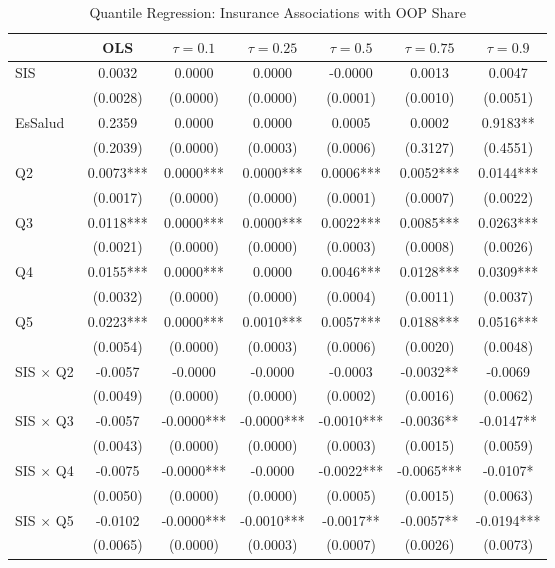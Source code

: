 \begin{table}[htbp]
\centering
\caption{Quantile Regression: Insurance Associations with OOP Share}
\label{tab:main_qr}
\scriptsize
\begin{tabular}{lcccccc}
\toprule
& OLS & $\tau=0.1$ & $\tau=0.25$ & $\tau=0.5$ & $\tau=0.75$ & $\tau=0.9$ \\
\midrule
  SIS & 0.0032 & 0.0000 & 0.0000 & -0.0000 & 0.0013 & 0.0047 \\
  & (0.0028) & (0.0000) & (0.0000) & (0.0001) & (0.0010) & (0.0051) \\
  EsSalud & 0.2359 & 0.0000 & 0.0000 & 0.0005 & 0.0002 & 0.9183** \\
  & (0.2039) & (0.0000) & (0.0003) & (0.0006) & (0.3127) & (0.4551) \\
  Q2 & 0.0073*** & 0.0000*** & 0.0000*** & 0.0006*** & 0.0052*** & 0.0144*** \\
  & (0.0017) & (0.0000) & (0.0000) & (0.0001) & (0.0007) & (0.0022) \\
  Q3 & 0.0118*** & 0.0000*** & 0.0000*** & 0.0022*** & 0.0085*** & 0.0263*** \\
  & (0.0021) & (0.0000) & (0.0000) & (0.0003) & (0.0008) & (0.0026) \\
  Q4 & 0.0155*** & 0.0000*** & 0.0000 & 0.0046*** & 0.0128*** & 0.0309*** \\
  & (0.0032) & (0.0000) & (0.0000) & (0.0004) & (0.0011) & (0.0037) \\
  Q5 & 0.0223*** & 0.0000*** & 0.0010*** & 0.0057*** & 0.0188*** & 0.0516*** \\
  & (0.0054) & (0.0000) & (0.0003) & (0.0006) & (0.0020) & (0.0048) \\
  SIS $\times$ Q2 & -0.0057 & -0.0000 & -0.0000 & -0.0003 & -0.0032** & -0.0069 \\
  & (0.0049) & (0.0000) & (0.0000) & (0.0002) & (0.0016) & (0.0062) \\
  SIS $\times$ Q3 & -0.0057 & -0.0000*** & -0.0000*** & -0.0010*** & -0.0036** & -0.0147** \\
  & (0.0043) & (0.0000) & (0.0000) & (0.0003) & (0.0015) & (0.0059) \\
  SIS $\times$ Q4 & -0.0075 & -0.0000*** & -0.0000 & -0.0022*** & -0.0065*** & -0.0107* \\
  & (0.0050) & (0.0000) & (0.0000) & (0.0005) & (0.0015) & (0.0063) \\
  SIS $\times$ Q5 & -0.0102 & -0.0000*** & -0.0010*** & -0.0017** & -0.0057** & -0.0194*** \\
  & (0.0065) & (0.0000) & (0.0003) & (0.0007) & (0.0026) & (0.0073) \\

\end{tabular}
\end{table}
